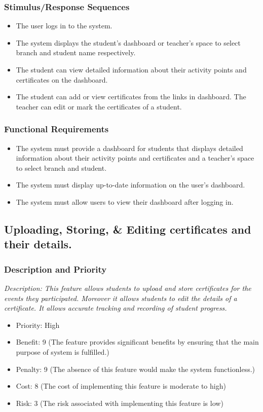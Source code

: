 \documentclass{article}
\begin{document}
\subsubsection{Stimulus/Response Sequences}
\begin{itemize}
  \item The user logs in to the system.
  \item The system displays the student’s dashboard or teacher's space to select branch and student name respectively.
  \item The student can view detailed information about their activity points and certificates on the dashboard.
  \item The student can add or view certificates from the links in dashboard. The teacher can edit or mark the certificates of a student.
\end{itemize}

\subsubsection{Functional Requirements}
\begin{itemize}
\item The system must provide a dashboard for students that displays detailed information about their activity points and certificates and a teacher's space to select branch and student.
\item The system must display up-to-date information on the user’s dashboard.
\item The system must allow users to view their dashboard after logging in.
\end{itemize}




\subsection{Uploading, Storing, \& Editing certificates and their details.}
\subsubsection{Description and Priority}
\emph{Description: This feature allows students to upload and store certificates for the events they participated. Moreover it allows students to edit the details of a certificate. It allows accurate tracking and recording of student progress.}
\begin{itemize}
  \item Priority: High
  \item Benefit: 9 (The feature provides significant benefits by ensuring that the main purpose of system is fulfilled.)
  \item Penalty: 9 (The absence of this feature would make the system functionless.)
  \item Cost: 8 (The cost of implementing this feature is moderate to high)
  \item Risk: 3 (The risk associated with implementing this feature is low)
\end{itemize}
\end{document}
